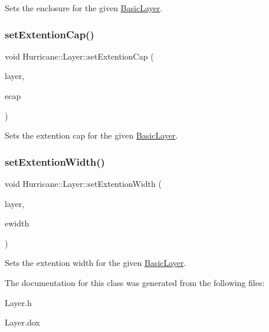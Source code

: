 Sets the enclosure for the given \mbox{\hyperlink{classHurricane_1_1BasicLayer}{Basic\+Layer}}. \mbox{\label{classHurricane_1_1Layer_a55c7b39e000442ea36a0774d26b7fbde}} 
\subsubsection{\texorpdfstring{set\+Extention\+Cap()}{setExtentionCap()}}
{\footnotesize\ttfamily void Hurricane\+::\+Layer\+::set\+Extention\+Cap (\begin{DoxyParamCaption}\item[{const \mbox{\hyperlink{classHurricane_1_1BasicLayer}{Basic\+Layer}} $\ast$}]{layer,  }\item[{\mbox{\hyperlink{group__DbUGroup_ga4fbfa3e8c89347af76c9628ea06c4146}{Db\+U\+::\+Unit}}}]{ecap }\end{DoxyParamCaption})\hspace{0.3cm}{\ttfamily [virtual]}}

Sets the extention cap for the given \mbox{\hyperlink{classHurricane_1_1BasicLayer}{Basic\+Layer}}. \mbox{\label{classHurricane_1_1Layer_a7a6943dbcb3403aff34056cd5de00e66}} 
\subsubsection{\texorpdfstring{set\+Extention\+Width()}{setExtentionWidth()}}
{\footnotesize\ttfamily void Hurricane\+::\+Layer\+::set\+Extention\+Width (\begin{DoxyParamCaption}\item[{const \mbox{\hyperlink{classHurricane_1_1BasicLayer}{Basic\+Layer}} $\ast$}]{layer,  }\item[{\mbox{\hyperlink{group__DbUGroup_ga4fbfa3e8c89347af76c9628ea06c4146}{Db\+U\+::\+Unit}}}]{ewidth }\end{DoxyParamCaption})\hspace{0.3cm}{\ttfamily [virtual]}}

Sets the extention width for the given \mbox{\hyperlink{classHurricane_1_1BasicLayer}{Basic\+Layer}}. 

The documentation for this class was generated from the following files\+:\begin{DoxyCompactItemize}
\item 
Layer.\+h\item 
Layer.\+dox\end{DoxyCompactItemize}
